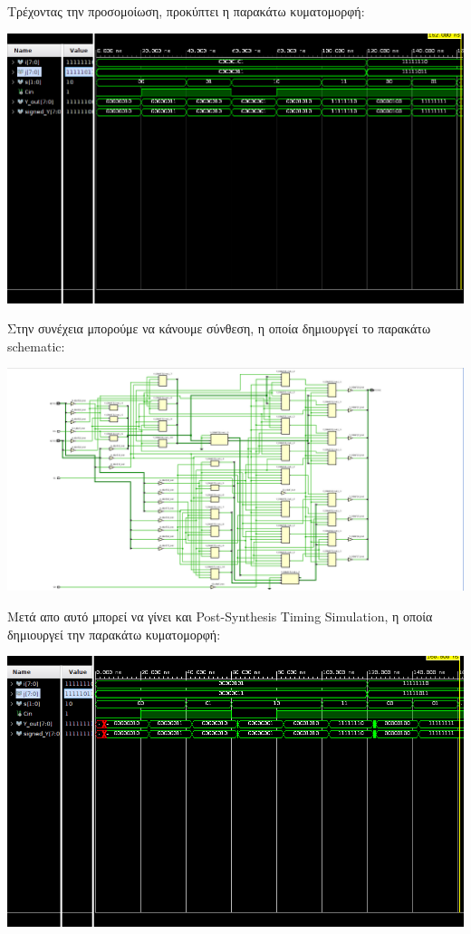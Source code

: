 \documentclass[11pt, a4paper]{report}
\begin{document}
Τρέχοντας την προσομοίωση, προκύπτει η παρακάτω κυματομορφή:
\begin{center}
	\includegraphics[width=\textwidth]{./images/alu-1/Behavioral_Sim_Fixed.png}
\end{center}

Στην συνέχεια μπορούμε να κάνουμε σύνθεση, η οποία δημιουργεί το παρακάτω schematic:
\begin{center}
	\includegraphics[width=\textwidth]{./images/alu-1/Synth_Schematic.png}
\end{center}

Μετά απο αυτό μπορεί να γίνει και Post-Synthesis Timing Simulation, η οποία δημιουργεί την παρακάτω κυματομορφή:
\begin{center}
	\includegraphics[width=\textwidth]{./images/alu-1/PST_Fixed.png}
\end{center}
\end{document}
